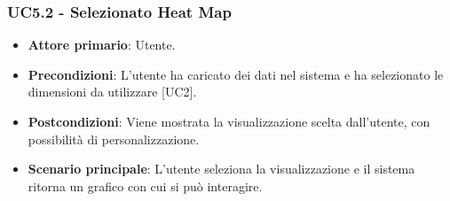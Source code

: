\subsubsection{UC5.2 - Selezionato Heat Map}
\begin{itemize}
	\item \textbf{Attore primario}: Utente.
	\item \textbf{Precondizioni}: L'utente ha caricato dei dati nel sistema e ha selezionato le dimensioni da utilizzare [UC2].
	\item \textbf{Postcondizioni}: Viene mostrata la visualizzazione  scelta dall'utente, con possibilità di personalizzazione.
	\item \textbf{Scenario principale}: L'utente seleziona la visualizzazione  e il sistema ritorna un grafico con cui si può interagire.

\end{itemize}